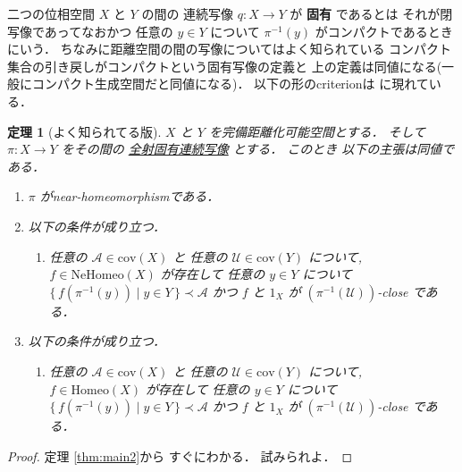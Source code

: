 \documentclass[leqno, a4paper, 12pt]{jsarticle}
\numberwithin{equation}{section}
\newtheorem{thm}{定理}
\newcommand{\yocov}[1]{\mathrm{cov}(#1)}
\newcommand{\yocovfont}[1]{\mathscr{#1}}
\newcommand{\yofine}{\prec}
\newcommand{\yomapnhset}[1]{\mathrm{NeHomeo}(#1)}
\newcommand{\yomaphset}[1]{\mathrm{Homeo}(#1)}
\begin{document}
二つの位相空間
$X$
と
$Y$
の間の
連続写像
$q\colon X\to Y$
が
\textbf{固有}
であるとは
それが閉写像であってなおかつ
任意の
$y\in Y$
について
$\pi^{-1}(y)$
がコンパクトであるときにいう．
ちなみに距離空間の間の写像についてはよく知られている
コンパクト集合の引き戻しがコンパクトという固有写像の定義と
上の定義は同値になる(一般にコンパクト生成空間だと同値になる)．
以下の形のcriterionは
\cite{zbMATH03511213}
に現れている．
\begin{thm}[よく知られてる版]\label{thm:main3}
$X$
と
$Y$
を完備距離化可能空間とする．
そして
$\pi \colon X\to Y$
をその間の
\underline{全射固有連続写像}
とする．
このとき
以下の主張は同値である．

\begin{enumerate}[label=\textup{(\arabic*)}]
\item\label{item:thmproper:1}
$\pi$
がnear-homeomorphismである．

\item\label{item:thmproper:2}
以下の条件が成り立つ．
\begin{enumerate}[label=\textup{(Bing-P)}, leftmargin=*]
\item\label{item:bingconditionp}
任意の
$\yocovfont{A}\in \yocov{X}$
と
任意の
$\yocovfont{U}\in \yocov{Y}$
について, 
$f\in \yomapnhset{X}$
が存在して
任意の
$y\in Y$
について
$\{\, f(\pi^{-1}(y))\mid y\in Y\, \}\yofine \yocovfont{A}$
かつ
$f$
と
$1_{X}$
が
$(\pi^{-1}(\yocovfont{U}))$-close
である．
\end{enumerate}

\item\label{item:thmproper:3}
以下の条件が成り立つ．
\begin{enumerate}[label=\textup{(Bing-$*$P)}, leftmargin=*]
\item\label{item:bingconditionpstar}
任意の
$\yocovfont{A}\in \yocov{X}$
と
任意の
$\yocovfont{U}\in \yocov{Y}$
について, 
$f\in \yomaphset{X}$
が存在して
任意の
$y\in Y$
について
$\{\, f(\pi^{-1}(y))\mid y\in Y\, \}\yofine \yocovfont{A}$
かつ
$f$
と
$1_{X}$
が
$(\pi^{-1}(\yocovfont{U}))$-close
である．
\end{enumerate}





\end{enumerate}
\end{thm}
\begin{proof}
定理
\ref{thm:main2}から
すぐにわかる．
試みられよ．
\end{proof}
\end{document}
